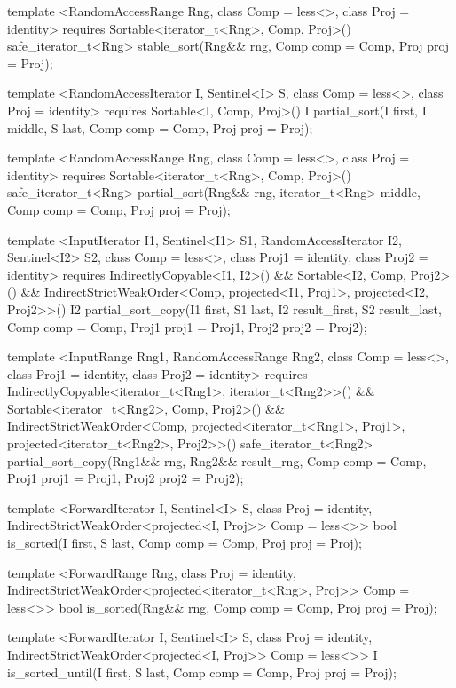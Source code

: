 \begin{codeblock}
{{{{  template <RandomAccessRange Rng, class Comp = less<>, class Proj = identity>
    requires Sortable<iterator_t<Rng>, Comp, Proj>()
    safe_iterator_t<Rng>
      stable_sort(Rng&& rng, Comp comp = Comp{}, Proj proj = Proj{});

  template <RandomAccessIterator I, Sentinel<I> S, class Comp = less<>,
      class Proj = identity>
    requires Sortable<I, Comp, Proj>()
    I partial_sort(I first, I middle, S last, Comp comp = Comp{}, Proj proj = Proj{});

  template <RandomAccessRange Rng, class Comp = less<>, class Proj = identity>
    requires Sortable<iterator_t<Rng>, Comp, Proj>()
    safe_iterator_t<Rng>
      partial_sort(Rng&& rng, iterator_t<Rng> middle, Comp comp = Comp{},
                   Proj proj = Proj{});

  template <InputIterator I1, Sentinel<I1> S1, RandomAccessIterator I2, Sentinel<I2> S2,
      class Comp = less<>, class Proj1 = identity, class Proj2 = identity>
    requires IndirectlyCopyable<I1, I2>() && Sortable<I2, Comp, Proj2>() &&
        IndirectStrictWeakOrder<Comp, projected<I1, Proj1>, projected<I2, Proj2>>()
    I2
      partial_sort_copy(I1 first, S1 last, I2 result_first, S2 result_last,
                        Comp comp = Comp{}, Proj1 proj1 = Proj1{}, Proj2 proj2 = Proj2{});

  template <InputRange Rng1, RandomAccessRange Rng2, class Comp = less<>,
      class Proj1 = identity, class Proj2 = identity>
    requires IndirectlyCopyable<iterator_t<Rng1>, iterator_t<Rng2>>() &&
        Sortable<iterator_t<Rng2>, Comp, Proj2>() &&
        IndirectStrictWeakOrder<Comp, projected<iterator_t<Rng1>, Proj1>,
          projected<iterator_t<Rng2>, Proj2>>()
    safe_iterator_t<Rng2>
      partial_sort_copy(Rng1&& rng, Rng2&& result_rng, Comp comp = Comp{},
                        Proj1 proj1 = Proj1{}, Proj2 proj2 = Proj2{});

  template <ForwardIterator I, Sentinel<I> S, class Proj = identity,
      IndirectStrictWeakOrder<projected<I, Proj>> Comp = less<>>
    bool is_sorted(I first, S last, Comp comp = Comp{}, Proj proj = Proj{});

  template <ForwardRange Rng, class Proj = identity,
      IndirectStrictWeakOrder<projected<iterator_t<Rng>, Proj>> Comp = less<>>
    bool
      is_sorted(Rng&& rng, Comp comp = Comp{}, Proj proj = Proj{});

  template <ForwardIterator I, Sentinel<I> S, class Proj = identity,
      IndirectStrictWeakOrder<projected<I, Proj>> Comp = less<>>
    I is_sorted_until(I first, S last, Comp comp = Comp{}, Proj proj = Proj{});

}}}}
\end{codeblock}
